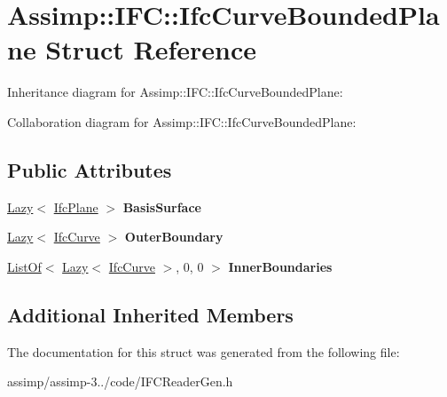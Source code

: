 \hypertarget{struct_assimp_1_1_i_f_c_1_1_ifc_curve_bounded_plane}{\section{Assimp\+:\+:I\+F\+C\+:\+:Ifc\+Curve\+Bounded\+Plane Struct Reference}
\label{struct_assimp_1_1_i_f_c_1_1_ifc_curve_bounded_plane}
}


Inheritance diagram for Assimp\+:\+:I\+F\+C\+:\+:Ifc\+Curve\+Bounded\+Plane\+:


Collaboration diagram for Assimp\+:\+:I\+F\+C\+:\+:Ifc\+Curve\+Bounded\+Plane\+:
\subsection*{Public Attributes}
\begin{DoxyCompactItemize}
\item 
\hypertarget{struct_assimp_1_1_i_f_c_1_1_ifc_curve_bounded_plane_af4e2a23ec7d8704787b485290629777e}{\hyperlink{struct_assimp_1_1_s_t_e_p_1_1_lazy}{Lazy}$<$ \hyperlink{struct_assimp_1_1_i_f_c_1_1_ifc_plane}{Ifc\+Plane} $>$ {\bfseries Basis\+Surface}}\label{struct_assimp_1_1_i_f_c_1_1_ifc_curve_bounded_plane_af4e2a23ec7d8704787b485290629777e}

\item 
\hypertarget{struct_assimp_1_1_i_f_c_1_1_ifc_curve_bounded_plane_a4f48443318ba139dde7ff5349bd7f03e}{\hyperlink{struct_assimp_1_1_s_t_e_p_1_1_lazy}{Lazy}$<$ \hyperlink{struct_assimp_1_1_i_f_c_1_1_ifc_curve}{Ifc\+Curve} $>$ {\bfseries Outer\+Boundary}}\label{struct_assimp_1_1_i_f_c_1_1_ifc_curve_bounded_plane_a4f48443318ba139dde7ff5349bd7f03e}

\item 
\hypertarget{struct_assimp_1_1_i_f_c_1_1_ifc_curve_bounded_plane_a1a695a36af3170ad9da25c12242b23d8}{\hyperlink{struct_assimp_1_1_s_t_e_p_1_1_list_of}{List\+Of}$<$ \hyperlink{struct_assimp_1_1_s_t_e_p_1_1_lazy}{Lazy}$<$ \hyperlink{struct_assimp_1_1_i_f_c_1_1_ifc_curve}{Ifc\+Curve} $>$, 0, 0 $>$ {\bfseries Inner\+Boundaries}}\label{struct_assimp_1_1_i_f_c_1_1_ifc_curve_bounded_plane_a1a695a36af3170ad9da25c12242b23d8}

\end{DoxyCompactItemize}
\subsection*{Additional Inherited Members}


The documentation for this struct was generated from the following file\+:\begin{DoxyCompactItemize}
\item 
assimp/assimp-\/3../code/I\+F\+C\+Reader\+Gen.\+h\end{DoxyCompactItemize}
